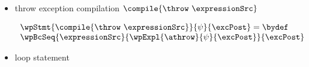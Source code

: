 \begin{itemize}
   \item throw exception compilation $\compile{\throw \ \expressionSrc }$
        
	 $$ \begin{array}{l} 
	         \wpStmt{ \compile{\throw \ \expressionSrc }   }{\psi}{\excPost} =\bydef \\ 
		 \wpBcSeq{ \expressionSrc }{ \wpExpl{\athrow}{\psi}{\excPost}}{\excPost} 
	 \end{array}
	 $$
   \item  loop statement
\end{itemize}
